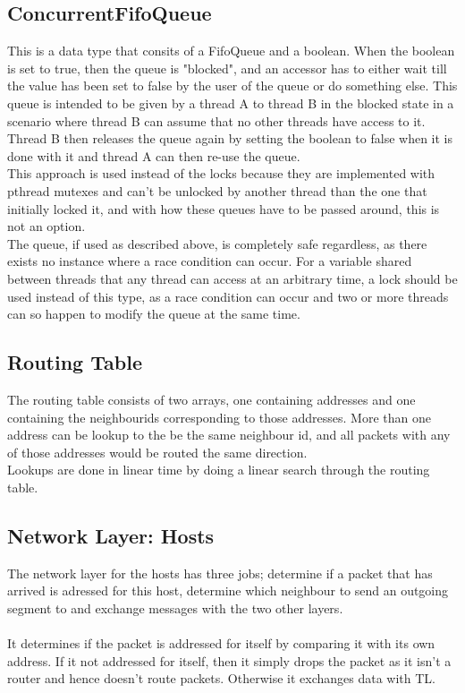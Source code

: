 \subsection{ConcurrentFifoQueue}
This is a data type that consits of a FifoQueue and a boolean. When the boolean is set to true, then the queue is "blocked", and an accessor has to either wait till the value has been set to false by the user of the queue or do something else. This queue is intended to be given by a thread A to thread B in the blocked state in a scenario where thread B can assume that no other threads have access to it. Thread B then releases the queue again by setting the boolean to false when it is done with it and thread A can then re-use the queue.\\
This approach is used instead of the locks because they are implemented with pthread mutexes and can't be unlocked by another thread than the one that initially locked it, and with how these queues have to be passed around, this is not an option.\\
The queue, if used as described above, is completely safe regardless, as there exists no instance where a race condition can occur. For a variable shared between threads that any thread can access at an arbitrary time, a lock should be used instead of this type, as a race condition can occur and two or more threads can so happen to modify the queue at the same time.

\subsection{Routing Table}
The routing table consists of two arrays, one containing addresses and one containing the neighbourids corresponding to those addresses. More than one address can be lookup to the be the same neighbour id, and all packets with any of those addresses would be routed the same direction.\\
Lookups are done in linear time by doing a linear search through the routing table.

\subsection{Network Layer: Hosts}
\label{sec:NLHosts}
The network layer for the hosts has three jobs; determine if a packet that has arrived is adressed for this host, determine which neighbour to send an outgoing segment to and exchange messages with the two other layers.\\
\\
It determines if the packet is addressed for itself by comparing it with its own address. If it not addressed for itself, then it simply drops the packet as it isn't a router and hence doesn't route packets. Otherwise it exchanges data with TL.\\

